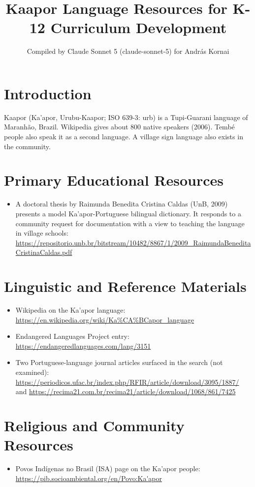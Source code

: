 \documentclass[12pt]{article}
\title{Kaapor Language Resources for K-12 Curriculum Development}
\author{Compiled by Claude Sonnet 5 (claude-sonnet-5) for Andr\'as Kornai}
\date{}
\begin{document}
\maketitle

\section{Introduction}
Kaapor (Ka'apor, Urubu-Kaapor; ISO 639-3: urb) is a Tupi-Guarani language of Maranhão, Brazil. Wikipedia gives about 800 native speakers (2006). Tembé people also speak it as a second language. A village sign language also exists in the community.

\section{Primary Educational Resources}
\begin{itemize}
\item A doctoral thesis by Raimunda Benedita Cristina Caldas (UnB, 2009) presents a model Ka'apor-Portuguese bilingual dictionary. It responds to a community request for documentation with a view to teaching the language in village schools: \url{https://repositorio.unb.br/bitstream/10482/8867/1/2009_RaimundaBeneditaCristinaCaldas.pdf}
\end{itemize}

\section{Linguistic and Reference Materials}
\begin{itemize}
\item Wikipedia on the Ka'apor language: \url{https://en.wikipedia.org/wiki/Ka%CA%BCapor_language}
\item Endangered Languages Project entry: \url{https://endangeredlanguages.com/lang/3151}
\item Two Portuguese-language journal articles surfaced in the search (not examined): \url{https://periodicos.ufac.br/index.php/RFIR/article/download/3095/1887/} and \url{https://recima21.com.br/recima21/article/download/1068/861/7425}
\end{itemize}

\section{Religious and Community Resources}
\begin{itemize}
\item Povos Indígenas no Brasil (ISA) page on the Ka'apor people: \url{https://pib.socioambiental.org/en/Povo:Ka'apor}
\end{itemize}
\end{document}

